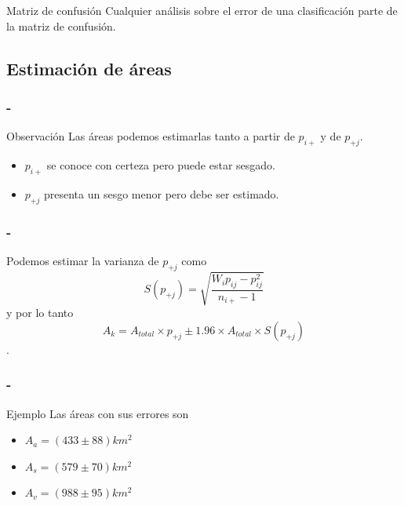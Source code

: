 \documentclass[]{beamer}
\begin{document}
\begin{frame}{\subsecname}
  \begin{block}{Matriz de confusión}
    Cualquier análisis sobre el error de una clasificación parte de la matriz de confusión.
  \end{block}
\end{frame}

\subsection{Estimación de áreas}

\begin{frame}
    \frametitle{\secname-\subsecname}
    \begin{block}{Observación}
        Las áreas podemos estimarlas tanto a partir de $p_{i+}$ y de
        $p_{+j}$.\pause
        \begin{itemize}
            \item $p_{i+}$ se conoce con certeza pero puede estar sesgado.
            \item $p_{+j}$ presenta un sesgo menor pero debe ser estimado.
        \end{itemize}
    \end{block}
\end{frame}

\begin{frame}
    \frametitle{\secname-\subsecname}
    Podemos estimar la varianza de $p_{+j}$ como
    \begin{equation}
        S(p_{+j}) = \sqrt{\frac{W_i p_{ij} - p_{ij}^2}{n_{i+}-1}}
    \end{equation}\pause
    y por lo tanto $$A_k = A_{total} \times p_{+j} \pm 1.96 \times
    A_{total}\times S(p_{+j})$$.
\end{frame}

\begin{frame}
    \frametitle{\secname-\subsecname}
 \begin{exampleblock}{Ejemplo}
     Las áreas con sus errores son
     \begin{itemize}
         \item $A_a = (433\pm88)km^2$
         \item $A_s = (579\pm70)km^2$
         \item $A_v = (988\pm95)km^2$
     \end{itemize}
  \end{exampleblock}
   
\end{frame}
\end{document}
